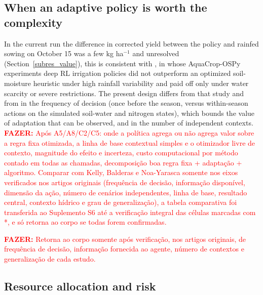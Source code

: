 \documentclass[times,final,authoryear]{elsarticle}
\begin{document}
\subsection{When an adaptive policy is worth the complexity}
\label{subdisc_value}

In the current run the difference in corrected yield between the policy and rainfed sowing on October 15 was a few kg ha$^{-1}$ and unresolved (Section~\ref{subres_value}), this is consistent with \citet{kelly2024assessing}, in whose AquaCrop-OSPy experiments deep RL irrigation policies did not outperform an optimized soil-moisture heuristic under high rainfall variability and paid off only under water scarcity or severe restrictions. The present design differs from that study and from \citet{balderas2025comparative} in the frequency of decision (once before the season, versus within-season actions on the simulated soil-water and nitrogen states), which bounds the value of adaptation that can be observed, and in the number of independent contexts. \textcolor{red}{\textbf{FAZER:} Após A5/A8/C2/C5: onde a política agrega ou não agrega valor sobre a regra fixa otimizada, a linha de base contextual simples e o otimizador livre de contexto, magnitude do efeito e incerteza, custo computacional por método contado em todas as chamadas, decomposição boa regra fixa + adaptação + algoritmo. Comparar com Kelly, Balderas e Noa-Yarasca somente nos eixos verificados nos artigos originais (frequência de decisão, informação disponível, dimensão da ação, número de cenários independentes, linha de base, resultado central, contexto hídrico e grau de generalização), a tabela comparativa foi transferida ao Suplemento S6 até a verificação integral das células marcadas com *, e só retorna ao corpo se todas forem confirmadas.}

\textcolor{red}{\textbf{FAZER:} Retorna ao corpo somente após verificação, nos artigos originais, de frequência de decisão, informação fornecida ao agente, número de contextos e generalização de cada estudo.}

\subsection{Resource allocation and risk}
\label{subdisc_resources}
\end{document}
